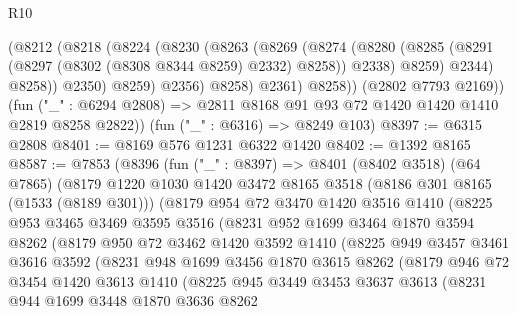 \begin{lexlean}{R10}
\begin{coremodule}
              (@8212
                (@8218
                  (@8224
                    (@8230
                      (@8263
                        (@8269
                          (@8274
                            (@8280
                              (@8285 (@8291 (@8297 (@8302 (@8308 @8344 @8259) @2332) @8258)) @2338)
                              @8259)
                            @2344)
                          @8258))
                      @2350)
                    @8259)
                  @2356)
                @8258)
              @2361)
            @8258))
        (@2802 @7793 @2169))
      (fun ("_" : @6294 @2808) => @2811 @8168 @91 @93 @72 @1420 @1420 @1410 @2819 @8258 @2822))
    (fun ("_" : @6316) => @8249 @103)
@8397 := @6315 @2808
@8401 := @8169 @576 @1231 @6322 @1420
@8402 := @1392 @8165
@8587 := @7853
    (@8396
      (fun ("_" : @8397) =>
      @8401
        (@8402 @3518)
        (@64 @7865)
        (@8179
          @1220
          @1030
          @1420
          @3472
          @8165
          @3518
          (@8186 @301 @8165 (@1533 (@8189 @301)))
          (@8179
            @954
            @72
            @3470
            @1420
            @3516
            @1410
            (@8225
              @953
              @3465
              @3469
              @3595
              @3516
              (@8231
                @952
                @1699
                @3464
                @1870
                @3594
                @8262
                (@8179
                  @950
                  @72
                  @3462
                  @1420
                  @3592
                  @1410
                  (@8225
                    @949
                    @3457
                    @3461
                    @3616
                    @3592
                    (@8231
                      @948
                      @1699
                      @3456
                      @1870
                      @3615
                      @8262
                      (@8179
                        @946
                        @72
                        @3454
                        @1420
                        @3613
                        @1410
                        (@8225
                          @945
                          @3449
                          @3453
                          @3637
                          @3613
                          (@8231
                            @944
                            @1699
                            @3448
                            @1870
                            @3636
                            @8262

\end{coremodule}
\end{lexlean}
